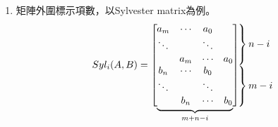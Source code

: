 \begin{enumerate}
\item
矩陣外圍標示項數，以Sylvester matrix為例。
\vspace{0.5cm}
\[
Syl_i(A,B)=\left[\phantom{\begin{matrix}a_0\\ \ddots\\a_0\\b_0\\ \ddots\\b_0 \end{matrix}}
\right.\hspace{-1.5em}
\underbrace{\begin{matrix}
a_m & \cdots & a_0 & \\
\ddots & & \ddots & \\
 & a_m & \cdots & a_0 \\
b_n & \cdots & b_0 & \\
\ddots & & \ddots & \\
 & b_n & \cdots & b_0
\end{matrix}}_{m+n-i}
\hspace{-1.5em}
\left.\phantom{\begin{matrix}a_0\\ \ddots\\a_0\\b_0\\ \ddots\\b_0 \end{matrix}}\right]\hspace{-1em}
\begin{tabular}{l}
$\left.\lefteqn{\phantom{\begin{matrix} a_0\\ \ddots\\ a_0\ \end{matrix}}}\right\}n-i$\\
$\left.\lefteqn{\phantom{\begin{matrix} b_0\\ \ddots\\ b_0\ \end{matrix}}} \right\}m-i$
\end{tabular}
\]
\end{enumerate}\bigskip
